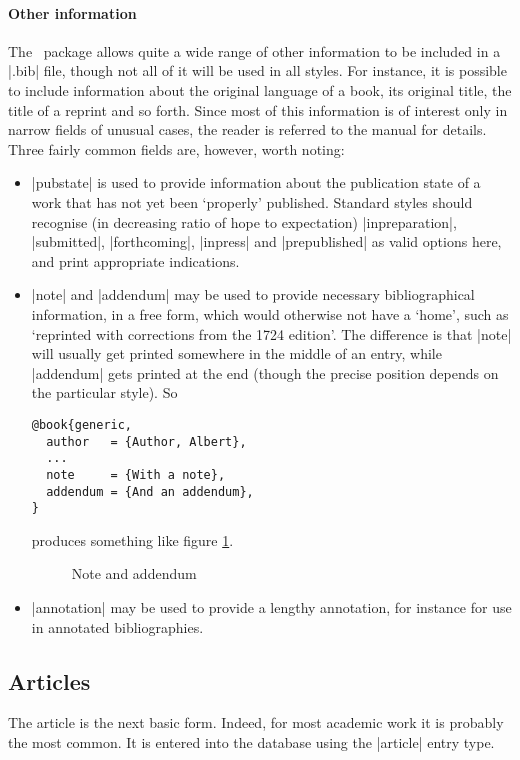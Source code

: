 {\paragraph{Other information} The \biblatex\ package allows quite a wide range of other information to be included in a |.bib| file, though not all of it will be used in all styles. For instance, it is possible to include information about the original language of a book, its original title, the title of a reprint and so forth. Since most of this information is of interest only in narrow fields of unusual cases, the reader is referred to the manual for details. Three fairly common fields are, however, worth noting:
\begin{itemize}
\item |pubstate| is used to provide information about the publication state of a work that has not yet been `properly' published. Standard styles should recognise (in decreasing ratio of hope to expectation) |inpreparation|, |submitted|, |forthcoming|, |inpress| and |prepublished| as valid options here, and print appropriate indications.
\item |note| and |addendum| may be used to provide necessary bibliographical information, in a free form, which would otherwise not have a `home', such as `reprinted with corrections from the 1724 edition'. The difference is that |note| will usually get printed somewhere in the middle of an entry, while |addendum| gets printed at the end (though the precise position depends on the particular style). So
\begin{verbatim}
@book{generic,
  author   = {Author, Albert},
  ...
  note     = {With a note},
  addendum = {And an addendum},
}
\end{verbatim}
produces something like figure \ref{addendum}.

\begin{figure}
\caption{Note and addendum\label{addendum}}
\end{figure}
\item |annotation| may be used to provide a lengthy annotation, for instance for use in annotated bibliographies.
\end{itemize}

\subsection{Articles}

The article is the next basic form. Indeed, for most academic work it is probably the most common. It is entered into the database using the |article| entry type.

}
